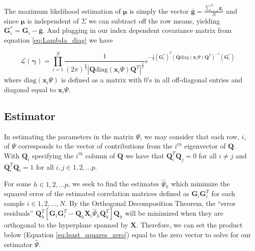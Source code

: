 The maximum likelihood estimation of $\mathbf{\mu}$ is simply the
vector $\mathbf{\bar{g}}=\frac{\sum_{i=1}^{N}\mathbf{g}_{i}}{N}$
and since $\mathbf{\mu}$ is independent of $\Sigma$ we can subtract
off the row means, yielding $\mathbf{G}_{i}^{*}=\mathbf{G}_{i}-\mathbf{\bar{g}}$.
And plugging in our index dependent covariance matrix from equation
\ref{eq:Lambda_diag} we have

\[
\mathcal{L}\left(\mathbf{\gamma}\right)=\prod_{i=1}^{N}\frac{1}{\left(2\pi\right)^{\frac{p}{2}}|\mathbf{Q}\text{diag}\left(\mathbf{x}_{i}\Psi\right)\mathbf{Q}^{T}|^{\frac{1}{2}}}e^{-\frac{1}{2}\left(\mathbf{G}_{i}^{*}\right)^{T}\left(\mathbf{Q}\text{diag}\left(\mathbf{x}_{i}\Psi\right)\mathbf{Q}^{T}\right)^{-1}\left(\mathbf{G}_{i}^{*}\right)}
\]
where $\text{diag}\left(\mathbf{x}_{i}\Psi\right)$ is defined as
a matrix with 0's in all off-diagonal entries and diagonal equal to
$\mathbf{x}_{i}\Psi$.

\subsection{Estimator}

In estimating the parameters in the matrix $\Psi$, we may consider
that each row, $i$, of $\Psi$ corresponds to the vector of contributions
from the $i^{th}$ eigenvector of $\mathbf{Q}$. With $\mathbf{Q}_{i}$
specifying the $i^{th}$ column of $\mathbf{Q}$ we have that $\mathbf{Q}_{i}^{T}\mathbf{Q}_{j}=0$
for all $i\ne j$ and $\mathbf{Q}_{i}^{T}\mathbf{Q}_{i}=1$ for all
$i,j\in1,2,\dots p$.

For some $h\in1,2,\dots p$, we seek to find the estimates $\hat{\Psi}_{h}$
which minimize the squared error of the estimated correlation matrices
defined as $\mathbf{G}_{i}\mathbf{G}_{i}^{T}$ for each sample $i\in1,2,\dots,N$.
By the Orthogonal Decomposition Theorem, the ``error residuals''
$\mathbf{Q}_{h}^{T}\left[\mathbf{G}_{i}\mathbf{G}_{i}^{T}-\mathbf{Q}_{h}\mathbf{X}_{i}\hat{\Psi}_{h}\mathbf{Q}_{h}^{T}\right]\mathbf{Q}_{h}$
will be minimized when they are orthogonal to the hyperplane spanned
by $\mathbf{X}$. Therefore, we can set the product below (Equation
\ref{eq:least_squares_zero}) equal to the zero vector to solve for
our estimator $\hat{\Psi}$.

